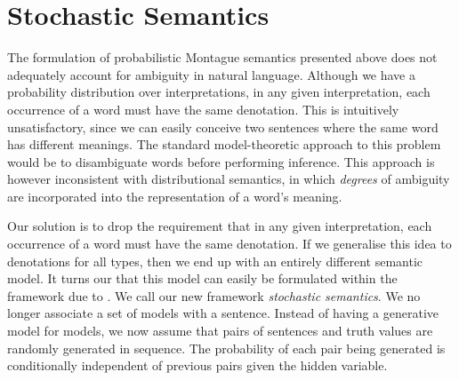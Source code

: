 \documentclass[11pt]{article}
\theoremstyle{definition}
\begin{document}
\section{Stochastic Semantics}

The formulation of probabilistic Montague semantics presented above does not
adequately account for ambiguity in natural language. Although we have
a probability distribution over interpretations, in any given
interpretation, each occurrence of a word must have the same
denotation. This is intuitively unsatisfactory, since we can easily
conceive two sentences where the same word has different meanings. The
standard model-theoretic approach to this problem would be to
disambiguate words before performing inference. This approach is
however inconsistent with
distributional  semantics, in which \emph{degrees} of
ambiguity are incorporated into the representation of a word's
meaning.

Our solution is to drop the requirement that in any given interpretation, each occurrence of a word must
have the same denotation. If we generalise this idea to denotations
for all types, then we end up with an entirely different semantic
model. It turns our that this model can easily be formulated within the framework due to
. We call our new framework \emph{stochastic semantics}. We no longer
associate a set of models with a sentence. Instead of having a
generative model for models, we now assume that pairs of sentences and
truth values are randomly generated in sequence. The probability of
each pair being generated is conditionally independent of previous
pairs given the hidden variable.

\end{document}
